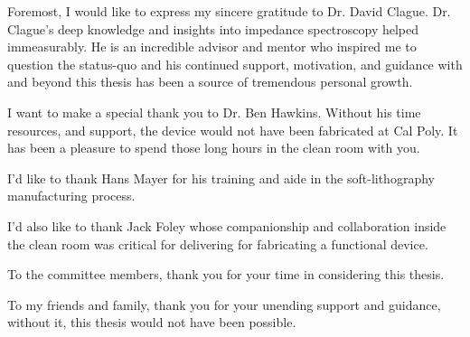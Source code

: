 
\mbox

\\

\par Foremost, I would like to express my sincere gratitude to Dr. David Clague. Dr. Clague's deep knowledge and insights into impedance spectroscopy helped immeasurably. He is an incredible advisor and mentor who inspired me to question the status-quo and his continued support, motivation, and guidance with and beyond this thesis has been a source of tremendous personal growth.
\\
\par I want to make a special thank you to Dr. Ben Hawkins. Without his time resources, and support, the device would not have been fabricated at Cal Poly. It has been a pleasure to spend those long hours in the clean room with you.
\\
\par I'd like to thank Hans Mayer for his training and aide in the soft-lithography manufacturing process.
\\
\par I'd also like to thank Jack Foley whose companionship and collaboration inside the clean room was critical for delivering for fabricating a functional device. 
\\
\par To the committee members, thank you for your time in considering this thesis.  
\\
\par To my friends and family, thank you for your unending support and guidance, without it, this thesis would not have been possible. 



